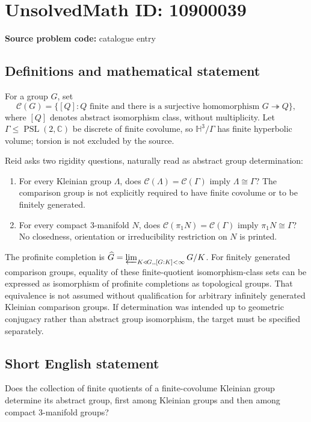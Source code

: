 \documentclass[11pt]{article}
\newcommand{\C}{\mathbb{C}}
\begin{document}
\section*{UnsolvedMath ID: 10900039}
\textbf{Source problem code:} catalogue entry
\subsection{Definitions and mathematical statement}
For a group \(G\), set
\[
 \mathcal C(G)=\{[Q]:Q\text{ finite and there is a surjective homomorphism }G\twoheadrightarrow Q\},
\]
where \([Q]\) denotes abstract isomorphism class, without multiplicity. Let \(\Gamma\leq\operatorname{PSL}(2,\C)\) be discrete of finite covolume, so \(\mathbb H^3/\Gamma\) has finite hyperbolic volume; torsion is not excluded by the source.

Reid asks two rigidity questions, naturally read as abstract group determination:
\begin{enumerate}
\item For every Kleinian group \(\Lambda\), does \(\mathcal C(\Lambda)=\mathcal C(\Gamma)\) imply \(\Lambda\cong\Gamma\)? The comparison group is not explicitly required to have finite covolume or to be finitely generated.
\item For every compact \(3\)-manifold \(N\), does \(\mathcal C(\pi_1N)=\mathcal C(\Gamma)\) imply \(\pi_1N\cong\Gamma\)? No closedness, orientation or irreducibility restriction on \(N\) is printed.
\end{enumerate}
The profinite completion is \(\widehat G=\varprojlim_{K\triangleleft G,,[G:K]<\infty}G/K\). For finitely generated comparison groups, equality of these finite-quotient isomorphism-class sets can be expressed as isomorphism of profinite completions as topological groups. That equivalence is not assumed without qualification for arbitrary infinitely generated Kleinian comparison groups. If determination was intended up to geometric conjugacy rather than abstract group isomorphism, the target must be specified separately.
\subsection{Short English statement}
Does the collection of finite quotients of a finite-covolume Kleinian group determine its abstract group, first among Kleinian groups and then among compact \(3\)-manifold groups?
\end{document}
